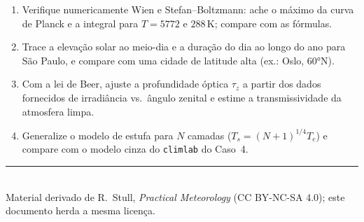 \documentclass[11pt]{article}
\begin{document}
\begin{enumerate}[label=\textbf{N\arabic*.},itemsep=4pt]
  \item Verifique numericamente Wien e Stefan--Boltzmann: ache o máximo da
        curva de Planck e a integral para $T = 5772$ e $288$\,K; compare
        com as fórmulas.
  \item Trace a elevação solar ao meio-dia e a duração do dia ao longo do
        ano para São Paulo, e compare com uma cidade de latitude alta
        (ex.: Oslo, $60°$N).
  \item Com a lei de Beer, ajuste a profundidade óptica $\tau_z$ a partir
        dos dados fornecidos de irradiância vs.\ ângulo zenital e estime a
        transmissividade da atmosfera limpa.
  \item Generalize o modelo de estufa para $N$ camadas
        ($T_s = (N{+}1)^{1/4}T_e$) e compare com o modelo cinza do
        \texttt{climlab} do Caso~4.
\end{enumerate}

\vspace{1em}
\noindent\rule{\linewidth}{0.4pt}\\
{\scriptsize Material derivado de R.~Stull, \emph{Practical Meteorology}
(CC BY-NC-SA 4.0); este documento herda a mesma licença.}
\end{document}
